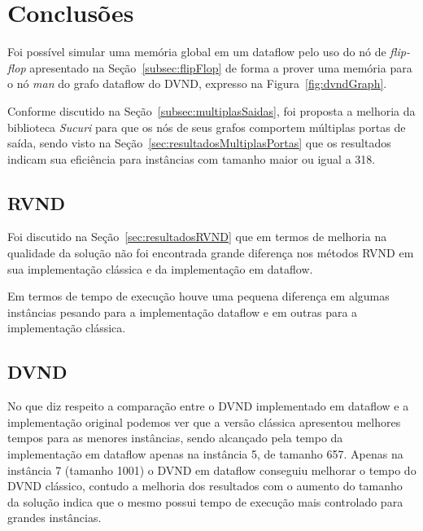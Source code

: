 \chapter{Conclusões} \label{cap:conclusao}


% 

Foi possível simular uma memória global em um dataflow pelo uso do nó de \textit{flip-flop} apresentado na Seção~\ref{subsec:flipFlop} de forma a prover uma memória para o nó \textit{man} do grafo dataflow do DVND, expresso na Figura~\ref{fig:dvndGraph}.

Conforme discutido na Seção~\ref{subsec:multiplasSaidas}, foi proposta a melhoria da biblioteca \textit{Sucuri} para que os nós de seus grafos comportem múltiplas portas de saída, sendo visto na Seção~\ref{sec:resultadosMultiplasPortas} que os resultados indicam sua eficiência para instâncias com tamanho maior ou igual a 318.

\section{RVND}

Foi discutido na Seção~\ref{sec:resultadosRVND} que em termos de melhoria na qualidade da solução não foi encontrada grande diferença nos métodos RVND em sua implementação clássica e da implementação em dataflow.

Em termos de tempo de execução houve uma pequena diferença em algumas instâncias pesando para a implementação dataflow e em outras para a implementação clássica.

\section{DVND}

No que diz respeito a comparação entre o DVND implementado em dataflow e a implementação original podemos ver que a versão clássica apresentou melhores tempos para as menores instâncias, sendo alcançado pela tempo da implementação em dataflow apenas na instância 5, de tamanho 657.
Apenas na instância 7 (tamanho 1001) o DVND em dataflow conseguiu melhorar o tempo do DVND clássico, contudo a melhoria dos resultados com o aumento do tamanho da solução indica que o mesmo possui tempo de execução mais controlado para grandes instâncias.

